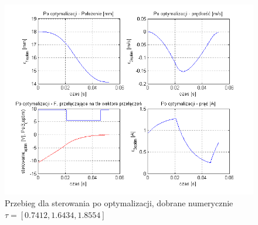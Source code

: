 \begin{figure}[!htb]
\centering
\includegraphics[scale=1]{img/optim3.png}
\caption{Przebieg dla sterowania po optymalizacji, dobrane numerycznie $\tau = [0.7412,  1.6434, 1.8554]$}
\label{rys:start1}
\end{figure}
